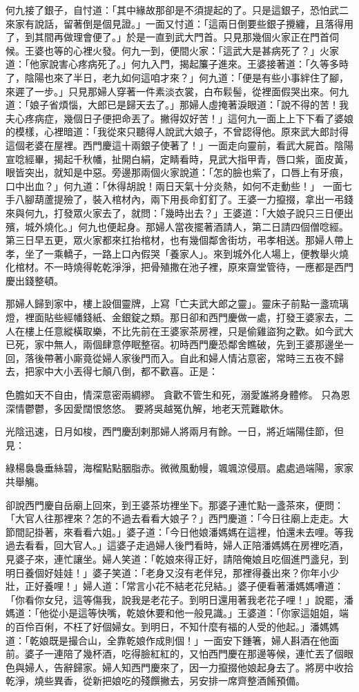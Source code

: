 何九接了銀子，自忖道：「其中緣故那卻是不須提起的了。只是這銀子，恐怕武二來家有說話，留著倒是個見證。」一面又忖道：「這兩日倒要些銀子攪纏，且落得用了，到其間再做理會便了。」於是一直到武大門首。只見那幾個火家正在門首伺候。王婆也等的心裡火發。何九一到，便間火家：「這武大是甚病死了？」火家道：「他家說害心疼病死了。」何九入門，揭起簾子進來。王婆接著道：「久等多時了，陰陽也來了半日，老九如何這咱才來？」何九道：「便是有些小事絆住了腳，來遲了一步。」只見那婦人穿著一件素淡衣裳，白布鬏髻，從裡面假哭出來。何九道：「娘子省煩惱，大郎已是歸天去了。」那婦人虛掩著淚眼道：「說不得的苦！我夫心疼病症，幾個日子便把命丟了。撇得奴好苦！」這何九一面上上下下看了婆娘的模樣，心裡暗道：「我從來只聽得人說武大娘子，不曾認得他。原來武大郎討得這個老婆在屋裡。西門慶這十兩銀子使著了！」一面走向靈前，看武大屍首。陰陽宣唸經畢，揭起千秋幡，扯開白絹，定睛看時，見武大指甲青，唇口紫，面皮黃，眼皆突出，就知是中惡。旁邊那兩個火家說道：「怎的臉也紫了，口唇上有牙痕，口中出血？」何九道：「休得胡說！兩日天氣十分炎熱，如何不走動些！」 一面七手八腳葫蘆提殮了，裝入棺材內，兩下用長命釘釘了。王婆一力攛掇，拿出一弔錢來與何九，打發眾火家去了，就問：「幾時出去？」王婆道：「大娘子說只三日便出殯，城外燒化。」何九也便起身。那婦人當夜擺著酒請人，第二日請四個僧唸經。第三日早五更，眾火家都來扛抬棺材，也有幾個鄰舍街坊，弔孝相送。那婦人帶上孝，坐了一乘轎子，一路上口內假哭「養家人」。來到城外化人場上，便教舉火燒化棺材。不一時燒得乾乾淨淨，把骨殖撒在池子裡，原來齋堂管待，一應都是西門慶出錢整頓。

那婦人歸到家中，樓上設個靈牌，上寫「亡夫武大郎之靈」。靈床子前點一盞琉璃燈，裡面貼些經幡錢紙、金銀錠之類。那日卻和西門慶做一處，打發王婆家去，二人在樓上任意縱橫取樂，不比先前在王婆家茶房裡，只是偷雞盜狗之歡。如今武大已死，家中無人，兩個肆意停眠整宿。初時西門慶恐鄰舍瞧破，先到王婆那邊坐一回，落後帶著小廝竟從婦人家後門而入。自此和婦人情沾意密，常時三五夜不歸去，把家中大小丟得七顛八倒，都不歡喜。正是：

色膽如天不自由，情深意密兩綢繆。
貪歡不管生和死，溺愛誰將身體修。
只為恩深情鬱鬱，多因愛闊恨悠悠。
要將吳越冤仇解，地老天荒難歇休。

光陰迅速，日月如梭，西門慶刮剌那婦人將兩月有餘。一日，將近端陽佳節，但見：

綠楊裊裊垂絲碧，海榴點點胭脂赤。微微風動幔，颯颯涼侵扇。處處過端陽，家家共舉觴。

卻說西門慶自岳廟上回來，到王婆茶坊裡坐下。那婆子連忙點一盞茶來，便問：「大官人往那裡來？怎的不過去看看大娘子？」西門慶道：「今日往廟上走走。大節間記掛著，來看看六姐。」婆子道：「今日他娘潘媽媽在這裡，怕還未去哩。等我過去看看，回大官人。」這婆子走過婦人後門看時，婦人正陪潘媽媽在房裡吃酒，見婆子來，連忙讓坐。婦人笑道：「乾娘來得正好，請陪俺娘且吃個進門盞兒，到明日養個好娃娃！」婆子笑道：「老身又沒有老伴兒，那裡得養出來？你年小少壯，正好養哩！」婦人道：「常言小花不結老花兒結。」婆子便看著潘媽媽嘈道：「你看你女兒，這等傷我，說我是老花子。到明日還用著我老花子哩！」說罷，潘媽道：「他從小是這等快嘴，乾娘休要和他一般見識。」王婆道：「你家這姐姐，端的百伶百俐，不枉了好個婦女。到明日，不知什麼有福的人受的他起。」潘媽媽道：「乾娘既是撮合山，全靠乾娘作成則個！」一面安下鍾箸，婦人斟酒在他面前。婆子一連陪了幾杯酒，吃得臉紅紅的，又怕西門慶在那邊等候，連忙丟了個眼色與婦人，告辭歸家。婦人知西門慶來了，因一力攛掇他娘起身去了。將房中收拾乾淨，燒些異香，從新把娘吃的殘饌撇去，另安排一席齊整酒餚預備。


